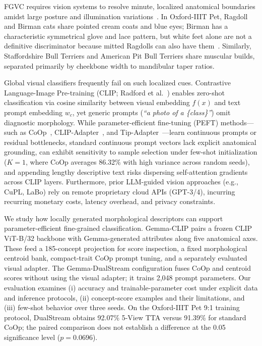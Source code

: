 \documentclass[conference]{IEEEtran}
\begin{document}
FGVC requires vision systems to resolve minute, localized anatomical boundaries amidst large posture and illumination variations~\cite{parkhi2012cats}. In Oxford-IIIT Pet, Ragdoll and Birman cats share pointed cream coats and blue eyes; Birman has a characteristic symmetrical glove and lace pattern, but white feet alone are not a definitive discriminator because mitted Ragdolls can also have them~\cite{cfa_ragdoll, cfa_birman}. Similarly, Staffordshire Bull Terriers and American Pit Bull Terriers share muscular builds, separated primarily by cheekbone width to mandibular taper ratios.

Global visual classifiers frequently fail on such localized cues. Contrastive Language-Image Pre-training (CLIP; Radford et al.~\cite{radford2021learning}) enables zero-shot classification via cosine similarity between visual embedding $f(x)$ and text prompt embedding $w_c$, yet generic prompts (\emph{``a photo of a \{class\}''}) omit diagnostic morphology. While parameter-efficient fine-tuning (PEFT) methods---such as CoOp~\cite{zhou2022learning}, CLIP-Adapter~\cite{gao2024clip}, and Tip-Adapter~\cite{zhang2022tip}---learn continuous prompts or residual bottlenecks, standard continuous prompt vectors lack explicit anatomical grounding, can exhibit sensitivity to sample selection under few-shot initialization ($K=1$, where CoOp averages 86.32\% with high variance across random seeds), and appending lengthy descriptive text risks dispersing self-attention gradients across CLIP layers. Furthermore, prior LLM-guided vision approaches (e.g., CuPL, LaBo) rely on remote proprietary cloud APIs (GPT-3/4), incurring recurring monetary costs, latency overhead, and privacy constraints.

We study how locally generated morphological descriptors can support parameter-efficient fine-grained classification. Gemma-CLIP pairs a frozen CLIP ViT-B/32 backbone with Gemma-generated attributes along five anatomical axes. These feed a 185-concept projection for score inspection, a fixed morphological centroid bank, compact-trait CoOp prompt tuning, and a separately evaluated visual adapter. The Gemma-DualStream configuration fuses CoOp and centroid scores without using the visual adapter; it trains 2,048 prompt parameters. Our evaluation examines (i) accuracy and trainable-parameter cost under explicit data and inference protocols, (ii) concept-score examples and their limitations, and (iii) few-shot behavior over three seeds. On the Oxford-IIIT Pet 9:1 training protocol, DualStream obtains 92.07\% 5-View TTA versus 91.39\% for standard CoOp; the paired comparison does not establish a difference at the 0.05 significance level ($p=0.0696$).
\end{document}
